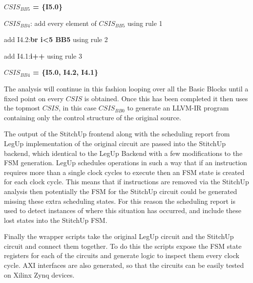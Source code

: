 \vspace{-2pt}
\noindent
\textbf{$CSIS_{BB5}$ = \{I5.0\}}

\vspace{1mm}
\noindent
$CSIS_{BB4}$: add every element of $CSIS_{BB5}$ using rule 1

\vspace{-2pt}
\hspace{13mm}add I4.2:\textbf{br i<5 BB5} using rule 2 

\vspace{-2pt}
\hspace{13mm}add I4.1:\textbf{i++} using rule 3

\vspace{-2pt}
\noindent
\textbf{$CSIS_{BB4}$ = \{I5.0, I4.2, I4.1\}}

\vspace{1mm}
\noindent

The analysis will continue in this fashion looping over all the Basic Blocks until a fixed
point on every $CSIS$ is obtained.
Once this has been completed it then uses the topmost $CSIS$, in this case $CSIS_{BB0}$ to
generate an LLVM-IR program containing only the control structure of the original
source.

The output of the StitchUp frontend along with the scheduling report from LegUp
implementation of the original circuit are passed into the StitchUp backend, which identical
to the LegUp Backend with a few modifications to the FSM generation.
LegUp schedules operations in such a way that if an instruction requires more than a single
clock cycles to execute then an FSM state is created for each clock cycle.
This means that if instructions are removed via the StitchUp analysis then potentially
the FSM for the StitchUp circuit could be generated missing these extra scheduling states.
For this reason the scheduling report is used to detect instances of where this situation has occurred,
and include these lost states into the StitchUp FSM.


Finally the wrapper scripts take the original LegUp circuit and the StitchUp circuit and
connect them together.
To do this the scripts expose the FSM state registers for each of the circuits and
generate logic to inspect them every clock cycle.
AXI interfaces are also generated, so that the circuits can be easily tested on Xilinx Zynq devices.
